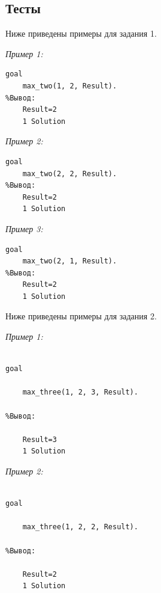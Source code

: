 \documentclass[a4paper,12pt]{article}
\begin{document}
	\newpage

	

	\subsection*{Тесты}

	

	Ниже приведены примеры для задания 1.

	

	\textit{Пример 1:}

	

	\begin{verbatim}
goal
	max_two(1, 2, Result).
%Вывод:
	Result=2
	1 Solution

	\end{verbatim}

	

	\textit{Пример 2:}

	

	
\begin{verbatim}
goal
	max_two(2, 2, Result).
%Вывод:
	Result=2
	1 Solution

	\end{verbatim}

	

	\textit{Пример 3:}

	

	\begin{verbatim}
goal
	max_two(2, 1, Result).
%Вывод:
	Result=2
	1 Solution

	\end{verbatim}

	

	
Ниже приведены примеры для задания 2.

	

	\textit{Пример 1:}

	

	\begin{verbatim}

goal

	max_three(1, 2, 3, Result).

%Вывод:

	Result=3
	1 Solution

	\end{verbatim}

	

	\textit{Пример 2:}

	

	\begin{verbatim}

goal

	max_three(1, 2, 2, Result).

%Вывод:

	Result=2
	1 Solution

	\end{verbatim}
\end{document}
